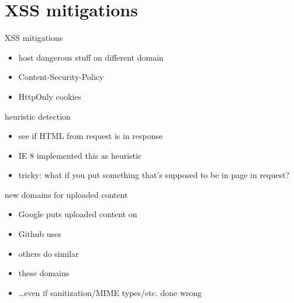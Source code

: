 \section{XSS mitigations}

\begin{frame}{XSS mitigations}
    \begin{itemize}
    \item host dangerous stuff on different domain
    \item Content-Security-Policy
    \item HttpOnly cookies
    \end{itemize}
\end{frame}

\begin{frame}{heuristic detection}
    \begin{itemize}
    \item see if HTML from request is in response
    \item IE 8 implemented this as heuristic
    \item tricky: what if you put something that's supposed to be in page in request?
    \end{itemize}
\end{frame}

\begin{frame}{new domains for uploaded content}
    \begin{itemize}

        \item Google puts uploaded content on 
        \item Github uses 
    \item others do similar
    \vspace{.5cm}
    \item these domains 
    \item \ldots even if sanitization/MIME types/etc. done wrong
    \end{itemize}
\end{frame}


